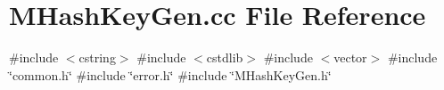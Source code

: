 \section{M\+Hash\+Key\+Gen.\+cc File Reference}
\label{MHashKeyGen_8cc}
{\ttfamily \#include $<$cstring$>$}\newline
{\ttfamily \#include $<$cstdlib$>$}\newline
{\ttfamily \#include $<$vector$>$}\newline
{\ttfamily \#include \char`\"{}common.\+h\char`\"{}}\newline
{\ttfamily \#include \char`\"{}error.\+h\char`\"{}}\newline
{\ttfamily \#include \char`\"{}M\+Hash\+Key\+Gen.\+h\char`\"{}}\newline
